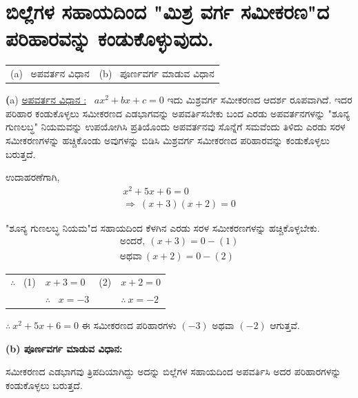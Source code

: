 \section*{ಬಿಲ್ಲೆಗಳ ಸಹಾಯದಿಂದ "ಮಿಶ್ರ ವರ್ಗ ಸಮೀಕರಣ"ದ ಪರಿಹಾರವನ್ನು ಕಂಡು\break ಕೊಳ್ಳುವುದು.}

\noindent
\begin{tabular}{@{}ll}
(a)~  ಅಪವರ್ತನ ವಿಧಾನ & (b)~ ಪೂರ್ಣವರ್ಗ ಮಾಡುವ ವಿಧಾನ
\end{tabular}

\smallskip
\noindent
{\textbf(a) {\underline{ಅಪವರ್ತನ ವಿಧಾನ :}}}~ $ax^2 + bx + c = 0$ ಇದು ಮಿಶ್ರವರ್ಗ ಸಮೀಕರಣದ ಆದರ್ಶ ರೂಪವಾಗಿದೆ. ಇದರ ಪರಿಹಾರ ಕಂಡುಕೊಳ್ಳಲು ಸಮೀಕರಣದ ಎಡಭಾಗವನ್ನು ಅಪವರ್ತಿಸಬೇಕು ಬಂದ ಎರಡು ಅಪವರ್ತನಗಳನ್ನು "ಶೂನ್ಯ ಗುಣಲಬ್ಧ" ನಿಯಮವನ್ನು ಉಪಯೋಗಿಸಿ ಪ್ರತಿಯೊಂದು ಅಪವರ್ತನವು ಸೊನ್ನೆಗೆ ಸಮವೆಂದು ತಿಳಿದು ಎರಡು ಸರಳ ಸಮೀಕರಣಗಳನ್ನು ಹಚ್ಚಿಕೊಂಡು ಅವುಗಳನ್ನು ಬಿಡಿಸಿ ಮಿಶ್ರವರ್ಗ ಸಮೀಕರಣದ ಪರಿಹಾರವನ್ನು ಕಂಡುಕೊಳ್ಳಲು ಬರುತ್ತದೆ. 

ಉದಾಹರಣೆಗಾಗಿ, 
\begin{gather*}
x^2 + 5x + 6 = 0\\
\Rightarrow~ (x+3)(x+2) = 0
\end{gather*}

"ಶೂನ್ಯ ಗುಣಲಬ್ಧ ನಿಯಮ"ದ ಸಹಾಯದಿಂದ ಕೆಳಗಿನ ಎರಡು ಸರಳ ಸಮೀಕರಣಗಳನ್ನು ಹಚ್ಚಿಕೊಳ್ಳಬೇಕು.
\begin{gather*}
\text{ಅಂದರೆ},~ (x+3) = 0 -(1) \\
\text{ಅಥವಾ}~ (x+2) = 0 -(2) 
\end{gather*}

\begin{tabular}{llll}
$\therefore$~ (1) & $x + 3 = 0$ & (2) & $x+2 = 0$\\
& $\therefore$~ $x = -3$ & &$\therefore~ x = -2$
\end{tabular}

$\therefore~ x^2 + 5x + 6 = 0$ ಈ ಸಮೀಕರಣದ ಪರಿಹಾರಗಳು $(-3)$ ಅಥವಾ $(-2)$ ಆಗುತ್ತವೆ.

\eject

\noindent 
\textbf{(b) ಪೂರ್ಣವರ್ಗ ಮಾಡುವ ವಿಧಾನ:}

ಸಮೀಕರಣದ ಎಡಭಾಗವು ತ್ರಿಪದಿಯಾಗಿದ್ದು ಅದನ್ನು ಬಿಲ್ಲೆಗಳ ಸಹಾಯದಿಂದ ಅಪ\-ವರ್ತಿಸಿ ಅದರ ಪರಿಹಾರಗಳನ್ನು ಕಂಡುಕೊಳ್ಳಲು ಬರುತ್ತದೆ. 

